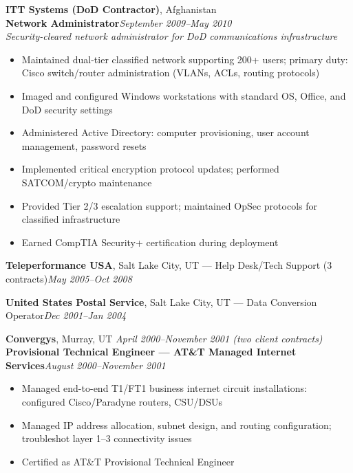 \documentclass[9pt,letterpaper]{extarticle}
\begin{document}
\vspace{5pt}
\noindent\textbf{ITT Systems (DoD Contractor)}, Afghanistan\\
\textbf{Network Administrator}\hfill\textit{September 2009--May 2010}\\
\textit{Security-cleared network administrator for DoD communications infrastructure}
\begin{itemize}
  \item Maintained dual-tier classified network supporting 200+ users; primary duty: Cisco switch/router administration (VLANs, ACLs, routing protocols)
  \item Imaged and configured Windows workstations with standard OS, Office, and DoD security settings
  \item Administered Active Directory: computer provisioning, user account management, password resets
  \item Implemented critical encryption protocol updates; performed SATCOM/crypto maintenance
  \item Provided Tier 2/3 escalation support; maintained OpSec protocols for classified infrastructure
  \item Earned CompTIA Security+ certification during deployment
\end{itemize}

\vspace{3pt}
\noindent\textbf{Teleperformance USA}, Salt Lake City, UT --- Help Desk/Tech Support (3 contracts)\hfill\textit{May 2005--Oct 2008}

\vspace{3pt}
\noindent\textbf{United States Postal Service}, Salt Lake City, UT --- Data Conversion Operator\hfill\textit{Dec 2001--Jan 2004}

\vspace{5pt}
\noindent\textbf{Convergys}, Murray, UT \textbar{} \textit{April 2000--November 2001 (two client contracts)}\\
\textbf{Provisional Technical Engineer --- AT\&T Managed Internet Services}\hfill\textit{August 2000--November 2001}
\begin{itemize}
  \item Managed end-to-end T1/FT1 business internet circuit installations: configured Cisco/Paradyne routers, CSU/DSUs
  \item Managed IP address allocation, subnet design, and routing configuration; troubleshot layer 1--3 connectivity issues
  \item Certified as AT\&T Provisional Technical Engineer
\end{itemize}
\end{document}
